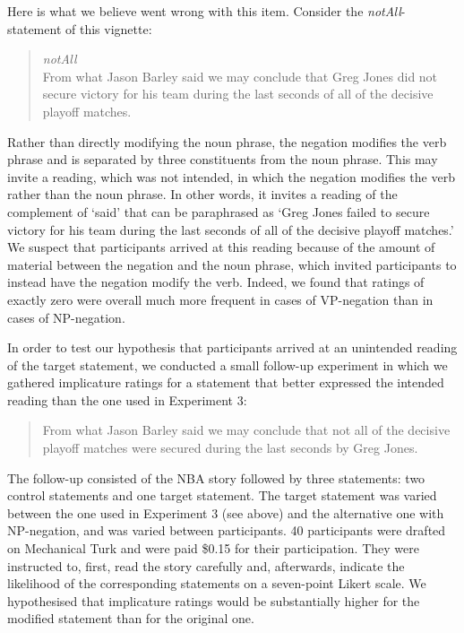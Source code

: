 \documentclass[12pt]{article}
\begin{document}
Here is what we believe went wrong with this item. Consider the \emph{notAll}-statement of this
vignette:

\begin{quote} \emph{notAll} \\
  From what Jason Barley said we may conclude that Greg Jones did not secure victory for his
  team during the last seconds of all of the decisive playoff matches.
\end{quote}

\noindent Rather than directly modifying the noun phrase, the negation modifies the verb phrase
and is separated by three constituents from the noun phrase. This may invite a reading, which
was not intended, in which the negation modifies the verb rather than the noun phrase. In other
words, it invites a reading of the complement of `said' that can be paraphrased as `Greg Jones
failed to secure victory for his team during the last seconds of all of the decisive playoff
matches.' We suspect that participants arrived at this reading because of the amount of
material between the negation and the noun phrase, which invited participants to instead have
the negation modify the verb. Indeed, we found that ratings of exactly zero were overall much
more frequent in cases of VP-negation than in cases of NP-negation. 

In order to test our hypothesis that participants arrived at an unintended reading of the
target statement, we conducted a small follow-up experiment in which we gathered implicature
ratings for a statement that better expressed the intended reading than the one used in
Experiment 3:

\begin{quote} From what Jason Barley said we may conclude that not all of the decisive playoff matches were secured during the last seconds by Greg Jones. \end{quote}

\noindent The follow-up consisted of the NBA story followed by three statements: two control
statements and one target statement. The target statement was varied between the one used in
Experiment 3 (see above) and the alternative one with NP-negation, and was varied between
participants. 40 participants were drafted on Mechanical Turk and were paid \$0.15 for their
participation. They were instructed to, first, read the story carefully and, afterwards,
indicate the likelihood of the corresponding statements on a seven-point Likert scale. We
hypothesised that implicature ratings would be substantially higher for the modified statement
than for the original one.
\end{document}
